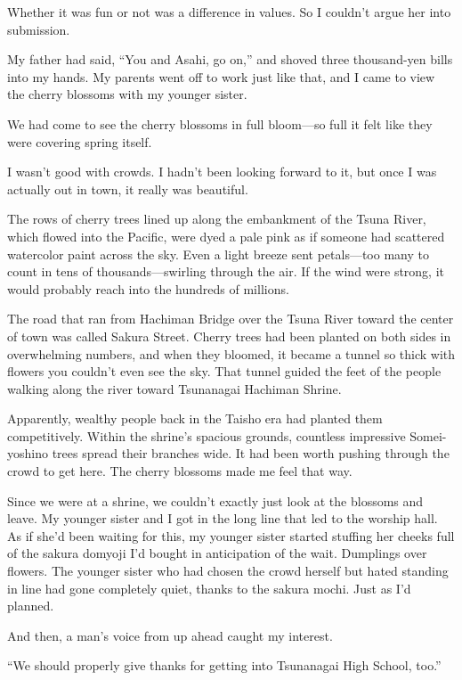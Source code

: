 \documentclass[
    a4paper,
    12pt,
    twoside,
    openany,
    UTF8,
    fontset=windows
]{ctexbook}
\begin{document}
Whether it was fun or not was a difference in values. So I couldn't argue her into submission.

My father had said, ``You and Asahi, go on,'' and shoved three thousand-yen bills into my hands. My parents went off to work just like that, and I came to view the cherry blossoms with my younger sister.

We had come to see the cherry blossoms in full bloom---so full it felt like they were covering spring itself.

I wasn't good with crowds. I hadn't been looking forward to it, but once I was actually out in town, it really was beautiful.

The rows of cherry trees lined up along the embankment of the Tsuna River, which flowed into the Pacific, were dyed a pale pink as if someone had scattered watercolor paint across the sky. Even a light breeze sent petals---too many to count in tens of thousands---swirling through the air. If the wind were strong, it would probably reach into the hundreds of millions.

The road that ran from Hachiman Bridge over the Tsuna River toward the center of town was called Sakura Street. Cherry trees had been planted on both sides in overwhelming numbers, and when they bloomed, it became a tunnel so thick with flowers you couldn't even see the sky. That tunnel guided the feet of the people walking along the river toward Tsunanagai Hachiman Shrine.

Apparently, wealthy people back in the Taisho era had planted them competitively. Within the shrine's spacious grounds, countless impressive Somei-yoshino trees spread their branches wide. It had been worth pushing through the crowd to get here. The cherry blossoms made me feel that way.

Since we were at a shrine, we couldn't exactly just look at the blossoms and leave. My younger sister and I got in the long line that led to the worship hall. As if she'd been waiting for this, my younger sister started stuffing her cheeks full of the sakura domyoji I'd bought in anticipation of the wait. Dumplings over flowers. The younger sister who had chosen the crowd herself but hated standing in line had gone completely quiet, thanks to the sakura mochi. Just as I'd planned.

And then, a man's voice from up ahead caught my interest.

``We should properly give thanks for getting into Tsunanagai High School, too.''
\end{document}
